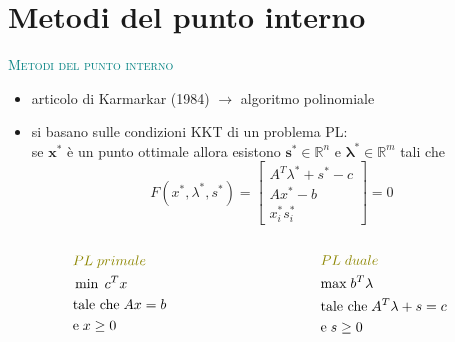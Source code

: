 
\section{Metodi del punto interno}

\begin{frame}[t]{\textcolor{teal}{\textsc{\LARGE Metodi del punto interno}}}

\pause
	\begin{itemize}
		\item articolo di Karmarkar (1984) %
		$\rightarrow$ algoritmo polinomiale
		\pause
		\item si basano sulle \textrm{condizioni KKT} di un problema PL:
		\pause\\[0.5 cm] \textrm{se $\mathbf{x}^{*}$ è un punto ottimale allora esistono $\mathbf{s}^{*}\in\mathbb{R}^{n}$ e $\mathbf{\lambda}^{*}\in\mathbb{R}^{m}$ tali che}
		\begin{equation*}
		\mathit{F}(x^{*},\lambda^{*},s^{*})= \begin{bmatrix}
		A^{T}\lambda^{*}+s^{*}-c \\Ax^{*}-b \\x^{*}_{i}s^{*}_{i}
		\end{bmatrix}=0
		\end{equation*}
		\end{itemize}
		\pause
	\begin{columns}
		\begin{column}{0.4\textwidth}
			\begin{equation*}
			\begin{split}
			&\textcolor{olive}{PL\; primale}\\
			&\min\;c^{T}x\\
			&\text{tale che\;}Ax= b\;\\&\text{e\;}x\geq0
			\end{split}
			\end{equation*}	
		\end{column}
		\begin{column}{0.4\textwidth}
			\begin{equation*}
			\begin{split}
			&\textcolor{olive}{PL\; duale}\\
			&\text{max\;}b^{T}\lambda\\
			&\text{tale che\;}A^{T}\lambda+s=c\\ &\text{e\;} s\geq0
			\end{split}
			\end{equation*}	
		\end{column}		
	\end{columns}
\end{frame}

